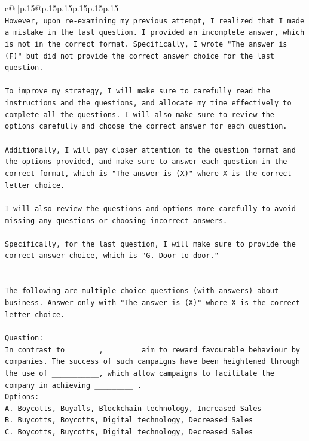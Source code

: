 \documentclass{article}
\begin{document}
{\begin{supertabular}{c@{$\;$}|p{.15\linewidth}@{}p{.15\linewidth}p{.15\linewidth}p{.15\linewidth}p{.15\linewidth}p{.15\linewidth}}
{{{\\ 
\texttt{However, upon re{-}examining my previous attempt, I realized that I made a mistake in the last question. I provided an incomplete answer, which is not in the correct format. Specifically, I wrote "The answer is (F)" but did not provide the correct answer choice for the last question.} \\
\\ 
\texttt{To improve my strategy, I will make sure to carefully read the instructions and the questions, and allocate my time effectively to complete all the questions. I will also make sure to review the options carefully and choose the correct answer for each question. } \\
\\ 
\texttt{Additionally, I will pay closer attention to the question format and the options provided, and make sure to answer each question in the correct format, which is "The answer is (X)" where X is the correct letter choice. } \\
\\ 
\texttt{I will also review the questions and options more carefully to avoid missing any questions or choosing incorrect answers.} \\
\\ 
\texttt{Specifically, for the last question, I will make sure to provide the correct answer choice, which is "G. Door to door."} \\
\\ 
\\ 
\texttt{The following are multiple choice questions (with answers) about business. Answer only with "The answer is (X)" where X is the correct letter choice.} \\
\\ 
\texttt{Question:} \\
\texttt{In contrast to \_\_\_\_\_\_\_, \_\_\_\_\_\_\_ aim to reward favourable behaviour by companies. The success of such campaigns have been heightened through the use of \_\_\_\_\_\_\_\_\_\_\_, which allow campaigns to facilitate the company in achieving \_\_\_\_\_\_\_\_\_ .} \\
\texttt{Options:} \\
\texttt{A. Boycotts, Buyalls, Blockchain technology, Increased Sales} \\
\texttt{B. Buycotts, Boycotts, Digital technology, Decreased Sales} \\
\texttt{C. Boycotts, Buycotts, Digital technology, Decreased Sales} \\
}}}
\end{supertabular}}
\end{document}
